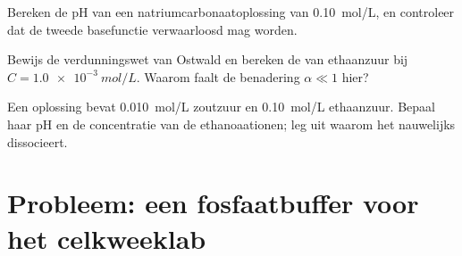 \begin{exercise}[$\star\star\star$]\label{exo:b1:predominant-reaction:10}
Bereken de pH van een natriumcarbonaatoplossing van \qty{0.10}{mol/L},
en controleer dat de tweede basefunctie verwaarloosd mag worden.
\end{exercise}

\begin{exercise}[$\star\star\star$]\label{exo:b1:predominant-reaction:11}
Bewijs de verdunningswet van Ostwald en bereken de  van
ethaanzuur bij $C = \qty{1.0e-3}{mol/L}$. Waarom faalt de benadering
$\alpha \ll 1$ hier?
\end{exercise}

\begin{exercise}[$\star\star\star$]\label{exo:b1:predominant-reaction:12}
Een oplossing bevat \qty{0.010}{mol/L} zoutzuur en \qty{0.10}{mol/L}
ethaanzuur. Bepaal haar pH en de concentratie van de ethanoaationen; leg
uit waarom het  nauwelijks dissocieert.
\end{exercise}

\section{Probleem: een fosfaatbuffer voor het celkweeklab}

